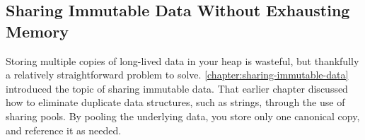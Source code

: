 %
%
%
%
%
%

\subsection{Sharing Immutable Data Without Exhausting Memory}
\label{sec:sharing-pools-safety}

Storing multiple copies of long-lived data in your heap is wasteful, but
thankfully a relatively straightforward problem to solve.
\autoref{chapter:sharing-immutable-data} introduced the topic of sharing
immutable data. That earlier chapter discussed how to eliminate duplicate data
structures, such as strings, through the use of sharing pools. By pooling the
underlying data, you store only one canonical copy, and reference it as needed.

